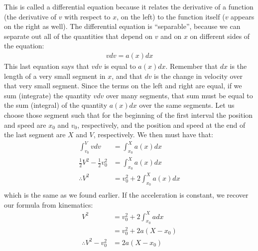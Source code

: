 This is called a differential equation because it relates the derivative of a function (the derivative of $v$ with respect to $x$, on the left) to the function itself ($v$ appears on the right as well). The differential equation is ``separable'', because we can separate out all of the quantities that depend on $v$ and on $x$ on different sides of the equation:
\begin{align*}
vdv = a(x)dx
\end{align*} 
This last equation says that $vdv$ is equal to $a(x)dx$. Remember that $dx$ is the length of a very small segment in $x$, and that $dv$ is the change in velocity over that very small segment. Since the terms on the left and right are equal, if we sum (integrate) the quantity $vdv$ over many segments, that sum must be equal to the sum (integral) of the quantity $a(x)dx$ over the same segments. Let us choose those segment such that for the beginning of the first interval the position and speed are $x_0$ and $v_0$, respectively, and the position and speed at the end of the last segment are $X$ and $V$, respectively. We then must have that:
\begin{align*}
\int_{v_0}^{V}vdv&=\int_{x_0}^{X}a(x)dx\\
 \frac{1}{2}V^2 - \frac{1}{2}v_0^2 &= \int_{x_0}^{X}a(x)dx\\
\therefore V^2 &= v_0^2 + 2\int_{x_0}^{X}a(x)dx\\
\end{align*}
which is the same as we found earlier. If the acceleration is constant, we recover our formula from kinematics:
\begin{align*}
V^2 &= v_0^2+ 2\int_{x_0}^{X}adx\\
&=v_0^2+ 2a(X-x_0)\\
\therefore V^2- v_0^2 &= 2a(X-x_0)
\end{align*}

